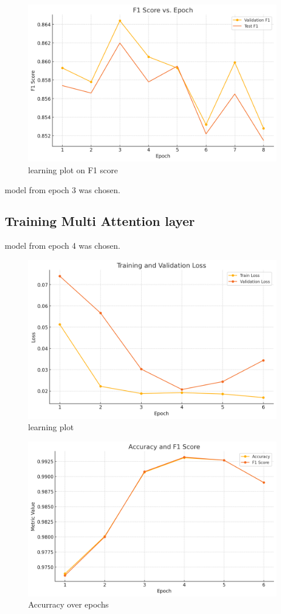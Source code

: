 \documentclass[
]{article}
\begin{document}
\begin{figure}
\centering
\includegraphics[width=0.5\linewidth,height=\textheight,keepaspectratio]{images/Robertector_F1.png}
\caption{learning plot on F1 score}
\end{figure}

model from epoch 3 was chosen.

\subsection{Training Multi Attention
layer}\label{training-multi-attention-layer-1}

model from epoch 4 was chosen.

\begin{cols}

\begin{col}{0.50\textwidth}

\begin{figure}
\centering
\includegraphics[width=0.5\linewidth,height=\textheight,keepaspectratio]{images/learning_plot_loss.png}
\caption{learning plot}
\end{figure}

\end{col}

\begin{col}{0.4\textwidth}

\begin{figure}
\centering
\includegraphics[width=0.5\linewidth,height=\textheight,keepaspectratio]{images/learning_plot_scores.png}
\caption{Accurracy over epochs}
\end{figure}

\end{col}

\end{cols}
\end{document}
